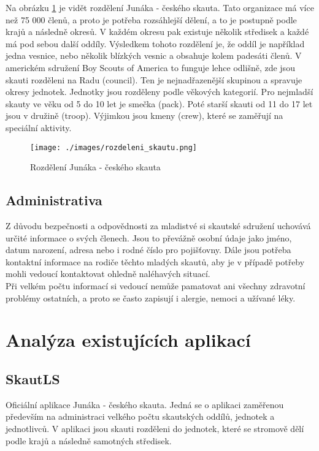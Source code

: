 \documentclass[twoside]{ctuthesis}
\begin{document}
Na obrázku \ref{fig:rozdeleni} je vidět rozdělení Junáka - českého skauta. Tato organizace má více než 75 000 členů, a proto je potřeba rozsáhlejší dělení, a to je postupně podle krajů a následně okresů. V každém okresu pak existuje několik středisek a každé má pod sebou další oddíly. Výsledkem tohoto rozdělení je, že oddíl je například jedna vesnice, nebo několik blízkých vesnic a obsahuje kolem padesáti členů.
V americkém sdružení Boy Scouts of America to funguje lehce odlišně, zde jsou skauti rozděleni na Radu (council). Ten je nejnadřazenější skupinou a spravuje okresy jednotek. Jednotky jsou rozděleny podle věkových kategorií. Pro nejmladší skauty ve věku od 5 do 10 let je smečka (pack). Poté starší skauti od 11 do 17 let jsou v družině (troop). Výjimkou jsou kmeny (crew), které se zaměřují na speciální aktivity.

\begin{figure}[!ht]
\texttt{[image: ./images/rozdeleni\_skautu.png]}
\caption{Rozdělení Junáka - českého skauta}
\label{fig:rozdeleni}
\end{figure}

\section{Administrativa}
Z důvodu bezpečnosti a odpovědnosti za mladistvé si skautské sdružení uchovává určité informace o svých členech. Jsou to převážně osobní údaje jako jméno, datum narození, adresa nebo i rodné číslo pro pojišťovny. Dále jsou potřeba kontaktní informace na rodiče těchto mladých skautů, aby je v případě potřeby mohli vedoucí kontaktovat ohledně naléhavých situací. \\
Při velkém počtu informací si vedoucí nemůže pamatovat ani všechny zdravotní problémy ostatních, a proto se často zapisují i alergie, nemoci a užívané léky.

\chapter{Analýza existujících aplikací}


\section{SkautLS}
Oficiální aplikace Junáka - českého skauta. Jedná se o aplikaci zaměřenou především na administraci velkého počtu skautských oddílů, jednotek a jednotlivců. V aplikaci jsou skauti rozděleni do jednotek, které se stromově dělí podle krajů a následně samotných středisek.
\end{document}
